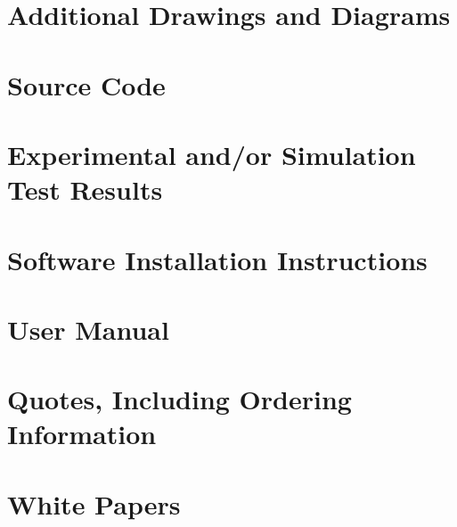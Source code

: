 \documentclass{article}
\begin{document}
\section{Additional Drawings and Diagrams}
\section{Source Code} 
\section{Experimental and/or Simulation Test Results} 
\section{Software Installation Instructions} 
\section{User Manual} 
\section{Quotes, Including Ordering Information} 
\section{White Papers} 
\end{document}
